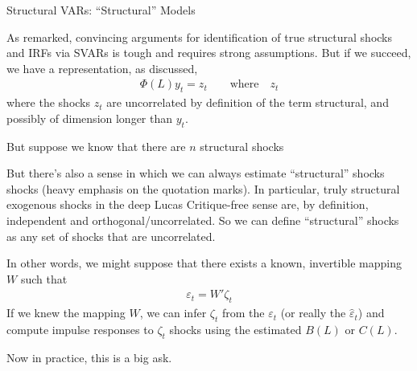 \documentclass[aspectratio=169, handout]{beamer}
\begin{document}


{\footnotesize
\begin{frame}{Structural VARs: ``Structural'' Models}

As remarked, convincing arguments for identification of
true \alert{structural shocks} and IRFs via SVARs is \alert{tough} and
requires strong assumptions.
But if we succeed, we have a representation, as discussed,
\begin{align*}
  \Phi(L)y_t = z_t
  \qquad \text{where}\quad
  z_t
\end{align*}
where the shocks $z_t$ are uncorrelated by definition of the term
\alert{structural}, and possibly of dimension longer than $y_t$.



But suppose we know that there are $n$ structural shocks

But there's also a sense in which we can always estimate
\alert{``structural'' shocks} shocks (heavy emphasis on the quotation
marks).
In particular, \alert{truly structural} exogenous shocks in the deep
Lucas Critique-free sense are, by definition, independent and
orthogonal/uncorrelated.
So we can define \alert{``structural'' shocks} as any set of shocks that
are uncorrelated.



In other words, we might
suppose that there exists a known, invertible mapping $W$ such that
\begin{align*}
  \varepsilon_t = W'\zeta_t
\end{align*}
If we knew the mapping $W$, we can infer $\zeta_t$ from the
$\varepsilon_t$ (or really the $\hat{\varepsilon}_t$) and compute
impulse responses to $\zeta_t$ shocks using the estimated $B(L)$ or
$C(L)$.

Now in practice, this is a \alert{big ask}.
\end{frame}
}
\end{document}
